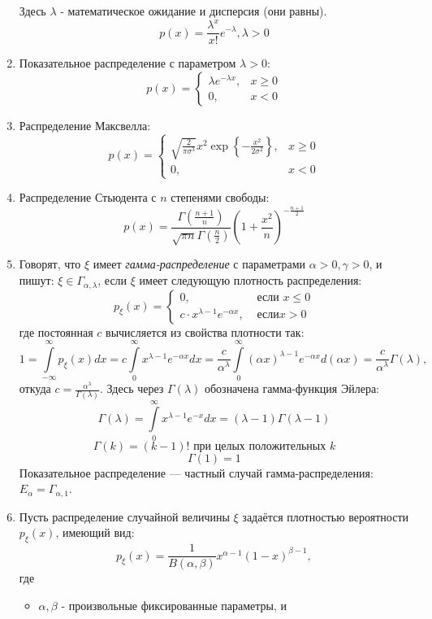 \begin{enumerate}
	Здесь $\lambda$ - математическое ожидание и дисперсия (они равны).
	\[p(x)=\frac{\lambda^x}{x!}e^{-\lambda}, \lambda>0\]
	\item Показательное распределение с параметром $\lambda > 0$:
	\[
	p(x) =
	\begin{cases}
		\lambda e^{- \lambda x}, &x \ge 0 \\
		0, &x  < 0
	\end{cases}
	\]
	\item Распределение Максвелла:
	\[
	p(x) =
	\begin{cases}
		\sqrt{\frac{2}{\pi \sigma^3}} x^2 \exp \left\{ - \frac{x^2}{2 \sigma^2} \right\}, &x \ge 0 \\
		0, &x < 0
	\end{cases}
	\]
	\item Распределение Стьюдента с $n$ степенями свободы:
	\[ p(x) = \frac{\Gamma \left( \frac{n+1}{n} \right)}{\sqrt{\pi n} \Gamma \left(\frac{n}{2}\right)} \left( 1 +  \frac{x^2}{n} \right)^{-\frac{n+1}{2}} \]
	\item Говорят, что $\xi$ имеет \textit{гамма-распределение} с параметрами $\alpha > 0, \gamma > 0$, и пишут: $\xi \in \Gamma_{\alpha, \lambda}$, если $\xi$ имеет следующую плотность распределения:
	\[
	p_{\xi} (x) =
	\begin{cases}
		0, & \text{ если } x \le 0 \\
		c \cdot x^{\lambda -1} e^{- \alpha x}, & \text{ если} x > 0
	\end{cases}
	\]
	где постоянная $c$ вычисляется из свойства плотности так:
	\[ 1 = \int\limits_{- \infty}^{\infty} p_{\xi} (x) dx = c \int\limits_{0}^{\infty} x^{\lambda - 1} e^{- \alpha x} dx = \frac{c}{\alpha^{\lambda}} \int\limits_{0}^{\infty} (\alpha x)^{\lambda - 1} e^{- \alpha x} d (\alpha x) = \frac{c}{\alpha^{\lambda}} \Gamma (\lambda), \]
	откуда $c = \frac{\alpha^{\lambda}}{\Gamma (\lambda)}$. Здесь через $\Gamma (\lambda)$ обозначена гамма-функция Эйлера:
	\[ \Gamma (\lambda) = \int\limits_{0}^{\infty} x^{\lambda - 1} e^{-x} dx = (\lambda - 1) \Gamma(\lambda - 1) \]
	\[ \Gamma (k) = (k - 1)! \text{ при целых положительных } k \]
	\[ \Gamma (1) = 1 \]
	Показательное распределение — частный случай гамма-распределения: $E_{\alpha} = \Gamma_{\alpha, 1}$.
	\item Пусть распределение случайной величины $\xi$ задаётся плотностью вероятности $p_{\xi} (x)$, имеющий вид:
	\[ p_{\xi} (x) = \frac{1}{B(\alpha, \beta)} x^{\alpha - 1} (1 - x)^{\beta - 1}, \]
	где
	\begin{itemize}
		\item $\alpha, \beta$ - произвольные фиксированные параметры, и

\end{itemize}
\end{enumerate}
